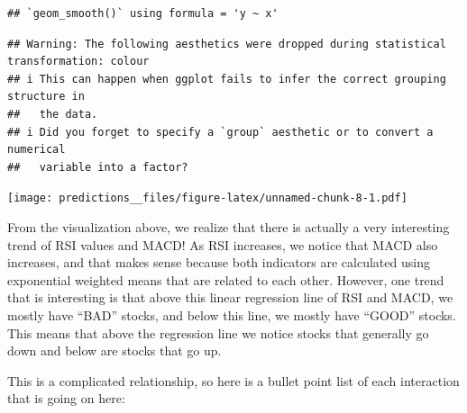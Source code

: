 \documentclass[
]{article}
\begin{document}
\begin{verbatim}
## `geom_smooth()` using formula = 'y ~ x'
\end{verbatim}

\begin{verbatim}
## Warning: The following aesthetics were dropped during statistical transformation: colour
## i This can happen when ggplot fails to infer the correct grouping structure in
##   the data.
## i Did you forget to specify a `group` aesthetic or to convert a numerical
##   variable into a factor?
\end{verbatim}

\texttt{[image: predictions\_\_files/figure-latex/unnamed-chunk-8-1.pdf]}

From the visualization above, we realize that there is actually a very
interesting trend of RSI values and MACD! As RSI increases, we notice
that MACD also increases, and that makes sense because both indicators
are calculated using exponential weighted means that are related to each
other. However, one trend that is interesting is that above this linear
regression line of RSI and MACD, we mostly have ``BAD'' stocks, and
below this line, we mostly have ``GOOD'' stocks. This means that above
the regression line we notice stocks that generally go down and below
are stocks that go up.

This is a complicated relationship, so here is a bullet point list of
each interaction that is going on here:
\end{document}
